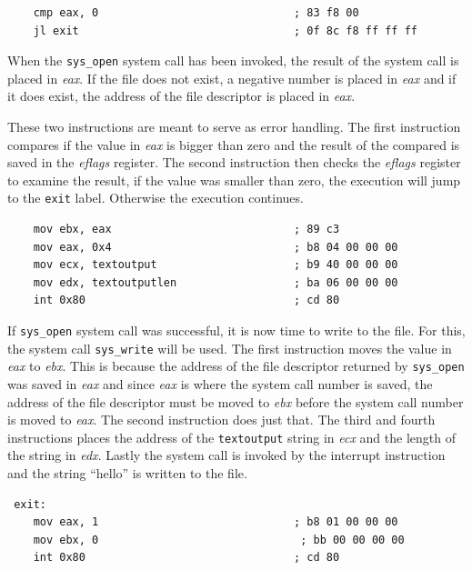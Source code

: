 \documentclass[11pt,twoside]{eitExjobb}
\begin{document}
\begin{verbatim}
    cmp eax, 0                              ; 83 f8 00
    jl exit                                 ; 0f 8c f8 ff ff ff
\end{verbatim}

\noindent When the \texttt{sys\_open} system call has been invoked, the result of the system call is placed in \emph{eax}. If the file does not exist, a negative number is placed in \emph{eax} and if it does exist, the address of the file descriptor is placed in \emph{eax}. 
 
These two instructions are meant to serve as error handling. The first instruction compares if the value in \emph{eax} is bigger than zero and the result of the compared is saved in the \emph{eflags} register. The second instruction then checks the \emph{eflags} register to examine the result, if the value was smaller than zero, the execution will jump to the \texttt{exit} label. Otherwise the execution continues.

\begin{verbatim}
    mov ebx, eax                            ; 89 c3
    mov eax, 0x4                            ; b8 04 00 00 00
    mov ecx, textoutput                     ; b9 40 00 00 00 
    mov edx, textoutputlen                  ; ba 06 00 00 00
    int 0x80                                ; cd 80
\end{verbatim}

\noindent If \texttt{sys\_open} system call was successful, it is now time to write to the file. For this, the system call \texttt{sys\_write} will be used. The first instruction moves the value in \emph{eax} to \emph{ebx}. This is because the address of the file descriptor returned by \texttt{sys\_open} was saved in \emph{eax} and since \emph{eax} is where the system call number is saved, the address of the file descriptor must be moved to \emph{ebx} before the system call number is moved to \emph{eax}. The second instruction does just that. The third and fourth instructions places the address of the \texttt{textoutput} string in \emph{ecx} and the length of the string in \emph{edx}. Lastly the system call is invoked by the interrupt instruction and the string ``hello'' is written to the file.

\begin{verbatim}
 exit:
    mov eax, 1                              ; b8 01 00 00 00 
    mov ebx, 0	                             ; bb 00 00 00 00 
    int 0x80                                ; cd 80
\end{verbatim}
\end{document}
